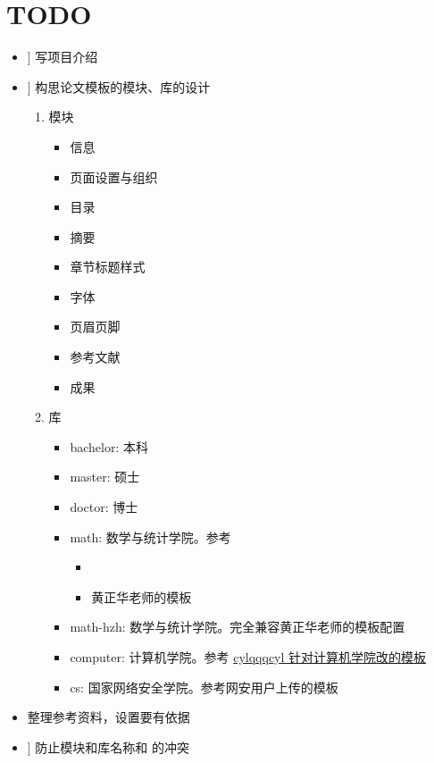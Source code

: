 

\chapter{TODO}

\newcommand\Done{\faCheckSquare[regular]} %
\newcommand\HalfDone{\faMinusSquare[regular]} %
\newcommand\NotDone{\faSquare[regular]} %
\newcommand\ToBeSpecified{\faPlusSquare[regular]} %

\goodbreak
\begin{itemize}[midpenalty=-1000,
  label=\protect\raisebox{-.3ex}{\NotDone}]
  \item[\Done] 写项目介绍
  \item[\ToBeSpecified] 构思论文模板的模块、库的设计
    \begin{enumerate}
      \item 模块
        \begin{itemize}[midpenalty=-1000,
          label=\protect\raisebox{-.3ex}{\NotDone}]
          \item 信息
          \item 页面设置与组织
          \item 目录
          \item 摘要
          \item 章节标题样式
          \item 字体
          \item 页眉页脚
          \item 参考文献
          \item 成果
        \end{itemize}
      \item 库
        \begin{itemize}[midpenalty=-1000,
          label=\protect\raisebox{-.3ex}{\NotDone}]
          \item bachelor: 本科
          \item master: 硕士
          \item doctor: 博士
          \item math: 数学与统计学院。参考
            \begin{itemize}
              \item {}
              \item 黄正华老师的模板
            \end{itemize}
          \item math-hzh: 数学与统计学院。完全兼容黄正华老师的模板配置
          \item computer: 计算机学院。参考 \href{https://github.com/cylqqqcyl/whu-thesis-2024}{cylqqqcyl 针对计算机学院改的模板}
          \item cs: 国家网络安全学院。参考网安用户上传的模板
        \end{itemize}
    \end{enumerate}
  \item 整理参考资料，设置要有依据
  \item[\Done] 防止模块和库名称和 \CusTeX 的冲突
\end{itemize}